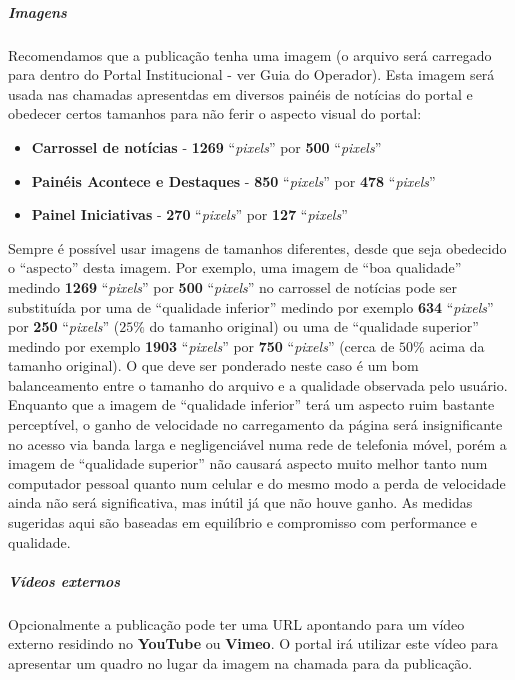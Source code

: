 \subparagraph{Imagens}

Recomendamos que a publicação tenha uma imagem (o arquivo será carregado para dentro do Portal Institucional - ver Guia do Operador). Esta imagem será usada nas chamadas apresentdas em diversos painéis de notícias do portal e obedecer certos tamanhos para não ferir o aspecto visual do portal:

\begin{itemize}
    \item \textbf{Carrossel de notícias} - \textbf{1269} ``\textit{pixels}'' por \textbf{500} ``\textit{pixels}''
    \item \textbf{Painéis Acontece e Destaques} - \textbf{850} ``\textit{pixels}'' por \textbf{478} ``\textit{pixels}''
    \item \textbf{Painel Iniciativas} - \textbf{270} ``\textit{pixels}'' por \textbf{127} ``\textit{pixels}''
\end{itemize}

\begin{displayquote}
    Sempre é possível usar imagens de tamanhos diferentes, desde que seja obedecido o ``aspecto'' desta imagem. Por exemplo, uma imagem de ``boa qualidade'' medindo \textbf{1269} ``\textit{pixels}'' por \textbf{500} ``\textit{pixels}'' no carrossel de notícias pode ser substituída por uma de ``qualidade inferior'' medindo por exemplo \textbf{634} ``\textit{pixels}'' por \textbf{250} ``\textit{pixels}'' ($25\%$ do tamanho original) ou uma de ``qualidade superior'' medindo por exemplo \textbf{1903} ``\textit{pixels}'' por \textbf{750} ``\textit{pixels}'' (cerca de $50\%$ acima da tamanho original). O que deve ser ponderado neste caso é um bom balanceamento entre o tamanho do arquivo e a qualidade observada pelo usuário. Enquanto que a imagem de ``qualidade inferior'' terá um aspecto ruim bastante perceptível, o ganho de velocidade no carregamento da página será insignificante no acesso via banda larga e negligenciável numa rede de telefonia móvel, porém a imagem de ``qualidade superior'' não causará aspecto muito melhor tanto num computador pessoal quanto num celular e do mesmo modo a perda de velocidade ainda não será significativa, mas inútil já que não houve ganho. As medidas sugeridas aqui são baseadas em equilíbrio e compromisso com performance e qualidade.
\end{displayquote}

\subparagraph{Vídeos externos}

Opcionalmente a publicação pode ter uma \gls{URL} apontando para um vídeo externo residindo no \textbf{YouTube} ou \textbf{Vimeo}. O portal irá utilizar este vídeo para apresentar um quadro no lugar da imagem na chamada para da publicação.

